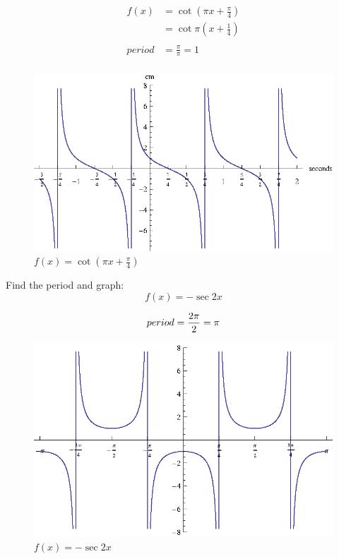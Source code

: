\documentclass[fleqn,addpoints]{exam}
\begin{document}
\begin{questions}
      \begin{solution}
        \begin{align*}
          f(x) & = \cot \left( \pi x + \frac{\pi}{4} \right) \\
               & = \cot \pi \left( x + \frac{1}{4} \right) \\
          \\
          period & = \frac{\pi}{\pi} = 1 \\
        \end{align*}

        \begin{figure}[H]
          \centering
          \includegraphics{graph2.eps}
          \caption{$f(x) = \cot \left( \pi x + \frac{\pi}{4} \right)$}
        \end{figure}

      \end{solution}

    \ifprintanswers
      \pagebreak
    \fi

    \question[10]
    Find the period and graph:
      \[
        f(x) = - \sec 2x
      \]

      \begin{solution}
        \[
          period = \frac{2 \pi}{2} = \pi \\
        \]

        \begin{figure}[H]
          \centering
          \includegraphics[scale=0.9]{graph3.eps}
          \caption{$f(x) = - \sec 2x $}
        \end{figure}


\end{solution}
\end{questions}
\end{document}

